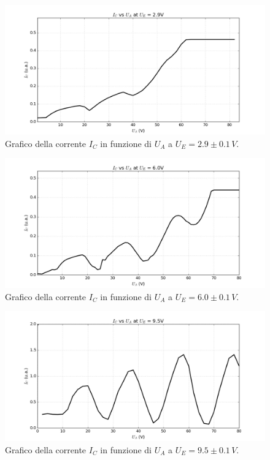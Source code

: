 \documentclass[10pt,a4paper]{article}
\begin{document}
\begin{table}[!htb]
\begin{table}[!htb]
\begin{figure}[!htb]
  \centering
  \includegraphics[scale=.5]{plot29.png}
\caption{Grafico della corrente $I_C$ in funzione di $U_A$ a $U_E = 2.9\pm0.1 \, V$.}
\label{grafico4}
\end{figure}

\begin{figure}[!htb]
  \centering
  \includegraphics[scale=.5]{plot60.png}
\caption{Grafico della corrente $I_C$ in funzione di $U_A$ a $U_E = 6.0 \pm 0.1\, V$.}
\label{grafico5}
\end{figure}

\begin{figure}[!htb]
  \centering
  \includegraphics[scale=.5]{plot95.png}
\caption{Grafico della corrente $I_C$ in funzione di $U_A$ a $U_E = 9.5 \pm 0.1\, V$.}
\label{grafico6}
\end{figure}



\end{table}
\end{table}
\end{document}

